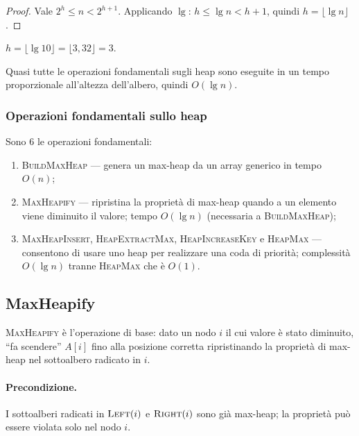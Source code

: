 \begin{proof}
	Vale $2^h \le n < 2^{h+1}$. Applicando $\lg$: $h \le \lg n < h+1$,
	quindi $h = \lfloor \lg n \rfloor$.
\end{proof}

\begin{esempio}[Altezza con $n=10$]
	$h = \lfloor \lg 10 \rfloor = \lfloor 3{,}32 \rfloor = 3$.
\end{esempio}

\begin{nota}
	Quasi tutte le operazioni fondamentali sugli heap sono eseguite in
	un tempo proporzionale all'altezza dell'albero, quindi $O(\lg n)$.
\end{nota}

\subsubsection{Operazioni fondamentali sullo heap}

Sono 6 le operazioni fondamentali:
\begin{enumerate}
	\item \textsc{BuildMaxHeap} — genera un max-heap da un array
	generico in tempo $O(n)$;
	\item \textsc{MaxHeapify} — ripristina la proprietà di max-heap
	quando a un elemento viene diminuito il valore; tempo
	$O(\lg n)$ (necessaria a \textsc{BuildMaxHeap});
	\item \textsc{MaxHeapInsert}, \textsc{HeapExtractMax},
	\textsc{HeapIncreaseKey} e \textsc{HeapMax} — consentono di
	usare uno heap per realizzare una coda di priorità; complessità
	$O(\lg n)$ tranne \textsc{HeapMax} che è $O(1)$.
\end{enumerate}

\subsection{MaxHeapify}

\begin{softnote}
	\textsc{MaxHeapify} è l'operazione di base: dato un nodo $i$ il cui
	valore è stato diminuito, ``fa scendere'' $A[i]$ fino alla posizione
	corretta ripristinando la proprietà di max-heap nel sottoalbero
	radicato in $i$.
\end{softnote}

\paragraph{Precondizione.}
I sottoalberi radicati in $\textsc{Left}(i)$ e $\textsc{Right}(i)$
sono già max-heap; la proprietà può essere violata solo nel nodo $i$.

